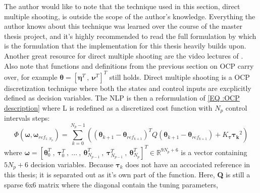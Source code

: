 The author would like to note that the technique used in this section, direct multiple shooting, is outside the scope of the author's knowledge.
Everything the author knows about this technique was learned over the course of the master thesis project, and it's highly recommended to read the full formulation by \cite{breivik2017mpc}
which is the formulation that the implementation for this thesis heavily builds upon. Another great resource for direct multiple shooting are the video lectures of \cite{gros2017Lecture}.
Also note that functions and definitions from the previous section on \gls{OCP} carry over, for example $\bm{\theta} = [\bm{\eta}^T \ , \ \bm{\nu}^T]^T$ still holds.\newline
Direct multiple shooting is a \gls{OCP} discretization technique where both the states and control inputs are excplicitly defined as decision variables.
The \gls{NLP} is then a reformulation of \eqref{EQ :OCP description} where L is redefined as a discretized cost function with $N_p$ control intervals steps:
\begin{equation} %
    \Phi(\bm{\omega}, \bm{\omega}_{ref_{1:N_p}}) = 
    \sum_{k=0}^{N_{p}-1} ((\bm{\theta}_{k+1} - \bm{\theta}_{ref_{k+1}})^T Q (\bm{\theta}_{k+1} - \bm{\theta}_{ref_{k+1}}) + K_{\bm{\tau}} \bm{\tau_k}^2)
\end{equation}
where $\bm{\omega} = [\bm{\theta}_0^T \ , \ \bm{\tau}_0^T \ , \ ... \ , \ \bm{\theta}_{N_{p-1}}^T \ , \ \bm{\tau}_{N_{p-1}}^T \ , \ \bm{\theta}_{N_{p}}^T]^T \in \mathbb{R}^{9N_{p}+6}$
is a vector containing $5N_p + 6$ decision variables.%
Because $\bm{\tau}_k$ does not have an accociated reference in this thesis; it is separated out as it's own part of the function.
Here, \textbf{Q} is still a sparse 6x6 matrix where the diagonal contain the tuning parameters,
